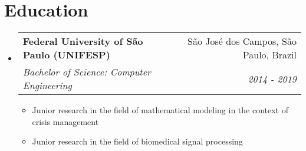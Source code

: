 \documentclass[letterpaper,10pt]{article}
\makeatletter
\newcommand{\resumeItem}[1]{
  \item\footnotesize{
    {#1 \vspace{-2pt}}
  }
}
\newcommand{\resumeSubheading}[4]{
  \vspace{6pt}\item
    \begin{tabular*}{0.97\textwidth}[t]{l@{\extracolsep{\fill}}r}
      \textbf{\small#1} & \small#2 \\
      \textit{\small#3} & \textit{\small #4} \\
    \end{tabular*}\vspace{-7pt}
}
\newcommand{\resumeSubHeadingListStart}{\begin{itemize}[leftmargin=0.15in, label={}]}
\newcommand{\resumeSubHeadingListEnd}{\end{itemize}}
\newcommand{\resumeItemListStart}{\vspace{1pt}\begin{itemize}}
\newcommand{\resumeItemListEnd}{\end{itemize}\vspace{-5pt}}
\makeatother
\begin{document}
\section{Education}
  \resumeSubHeadingListStart
    \resumeSubheading
      {Federal University of São Paulo (UNIFESP)}{São José dos Campos, São Paulo, Brazil}
      {Bachelor of Science: Computer Engineering}{2014 - 2019}
      \resumeItemListStart
        \resumeItem{Junior research in the field of mathematical modeling in the context of crisis management}
        \resumeItem{Junior research in the field of biomedical signal processing}
      \resumeItemListEnd
  \resumeSubHeadingListEnd

\end{document}
